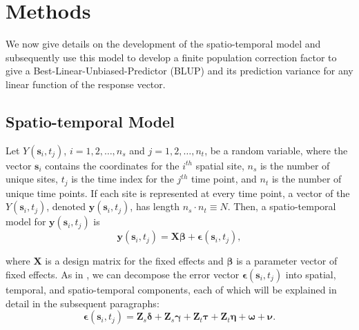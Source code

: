 \documentclass[]{interact}
\theoremstyle{plain}%
\theoremstyle{definition}
\theoremstyle{remark}
\begin{document}
\section{Methods} \label{section:Methods}

We now give details on the development of the spatio-temporal model and
subsequently use this model to develop a finite population correction
factor to give a Best-Linear-Unbiased-Predictor (BLUP) and its
prediction variance for any linear function of the response vector.

\subsection{Spatio-temporal Model}

Let \(Y(\mathbf{s}_{i}, t_j)\), \(i = 1, 2, \ldots, n_{s}\) and
\(j = 1, 2, \ldots, n_{t}\), be a random variable, where the vector
\(\mathbf{s}_i\) contains the coordinates for the \(i^{th}\) spatial
site, \(n_s\) is the number of unique sites, \(t_j\) is the time index
for the \(j^{th}\) time point, and \(n_t\) is the number of unique time
points. If each site is represented at every time point, a vector of the
\(Y(\mathbf{s}_{i}, t_j)\), denoted \(\mathbf{y}(\mathbf{s}_{i}, t_j)\),
has length \(n_{s} \cdot n_{t} \equiv N\). Then, a spatio-temporal model
for \(\mathbf{y}(\mathbf{s}_{i}, t_j)\) is \mbox{} \begin{equation}
\mathbf{y}(\mathbf{s}_{i}, t_j) = \mathbf{X} \bm{\beta} + \bm{\epsilon}(\mathbf{s}_{i}, t_j),
\end{equation}

\noindent where \(\mathbf{X}\) is a design matrix for the fixed effects
and \(\bm{\beta}\) is a parameter vector of fixed effects. As in
\citet{dumelle2021linear}, we can decompose the error vector
\(\bm{\epsilon}(\mathbf{s}_{i}, t_j)\) into spatial, temporal, and
spatio-temporal components, each of which will be explained in detail in
the subsequent paragraphs: \mbox{}
\begin{equation} \label{equation:basicmod}
\bm{\epsilon}(\mathbf{s}_{i}, t_j) = \mathbf{Z}_{s} \bm{\delta} + \mathbf{Z}_{s} \bm{\gamma} + \mathbf{Z}_t \bm{\tau} + \mathbf{Z}_t \bm{\eta} + \bm{\omega} + \bm{\nu}.
\end{equation}
\end{document}
